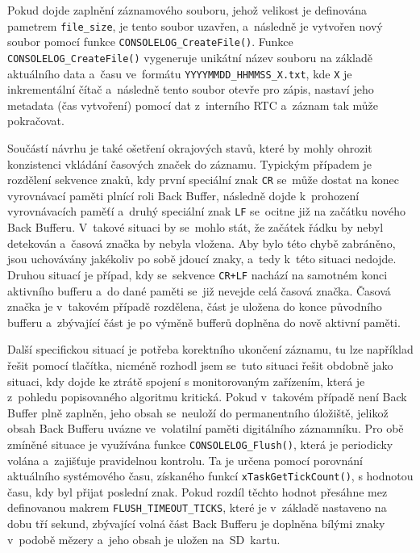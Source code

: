 Pokud dojde zaplnění záznamového souboru, jehož velikost je definována pametrem \texttt{file\_size}, je tento soubor uzavřen, a~následně je vytvořen nový soubor pomocí funkce \texttt{CONSOLELOG\_CreateFile()}. Funkce \texttt{CONSOLELOG\_CreateFile()} vygeneruje unikátní název souboru na základě aktuálního data a~času ve~formátu \texttt{YYYYMMDD\_HHMMSS\_X.txt}, kde \texttt{X} je inkrementální čítač a~následně tento soubor otevře pro zápis, nastaví jeho metadata (čas vytvoření) pomocí dat z~interního RTC a~záznam tak může pokračovat.

Součástí návrhu je také ošetření okrajových stavů, které by mohly ohrozit konzistenci vkládání časových značek do záznamu. Typickým případem je rozdělení sekvence znaků, kdy první speciální znak \texttt{CR} se~může dostat na konec vyrovnávací paměti plnící roli Back Buffer, následně dojde k~prohození vyrovnávacích paměťí a~druhý speciální znak \texttt{LF} se~ocitne již na začátku nového Back Bufferu. V~takové situaci by se~mohlo stát, že začátek řádku by nebyl detekován a~časová značka by nebyla vložena. Aby bylo této chybě zabráněno, jsou uchovávány jakékoliv po sobě jdoucí znaky, a~tedy k~této situaci nedojde. Druhou situací je případ, kdy se~sekvence \texttt{CR+LF} nachází na samotném konci aktivního bufferu a~do dané paměti se~již nevejde celá časová značka. Časová značka je v~takovém případě rozdělena, část je uložena do konce původního bufferu a~zbývající část je po výměně bufferů doplněna do nově aktivní paměti.

\newpage

Další specifickou situací je potřeba korektního ukončení záznamu, tu lze například řešit pomocí tlačítka, nicméně rozhodl jsem se~tuto situaci řešit obdobně jako situaci, kdy dojde ke ztrátě spojení s monitorovaným zařízením, která je z~pohledu popisovaného algoritmu kritická. Pokud v~takovém případě není Back Buffer plně zaplněn, jeho obsah se~neuloží do permanentního úložiště,  jelikož obsah Back Bufferu uvázne ve~volatilní paměti digitálního záznamníku. Pro obě zmíněné situace je využívána funkce \texttt{CONSOLELOG\_Flush()}, která je periodicky volána a~zajišťuje pravidelnou kontrolu. Ta je určena pomocí porovnání aktuálního systémového času, získaného funkcí \texttt{xTaskGetTickCount()}, s hodnotou času, kdy byl přijat poslední znak. Pokud rozdíl těchto hodnot přesáhne mez definovanou makrem \texttt{FLUSH\_TIMEOUT\_TICKS}, které je v~základě nastaveno na dobu tří sekund, zbývající volná část Back Bufferu je doplněna bílými znaky v~podobě mězery a~jeho obsah je uložen na~SD~kartu.

